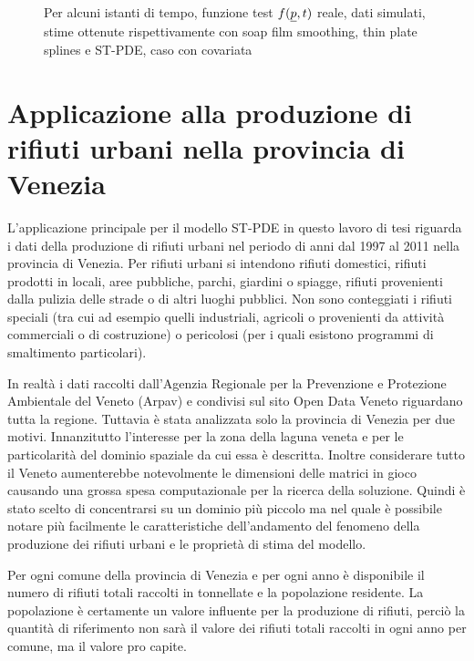 \documentclass[a4paper,11pt,twoside,openright]{book}							%
\begin{document}
\begin{landscape}
\begin{figure}
\begin{tabular}{lccccccc}
\end{tabular}
\caption{Per alcuni istanti di tempo, funzione test $f(\protect\underline{p},t)$ reale, dati simulati, stime ottenute rispettivamente con soap film smoothing, thin plate splines e ST-PDE, caso con covariata}
\label{fig:confronto_altri_metodi_cov}
\end{figure}
\end{landscape}


\chapter{Applicazione alla produzione di rifiuti urbani nella provincia di Venezia}
\label{cap:rifiuti}

L'applicazione principale per il modello ST-PDE in questo lavoro di tesi riguarda i dati della produzione di rifiuti urbani nel periodo di anni dal 1997 al 2011 nella provincia di Venezia. Per rifiuti urbani si intendono rifiuti domestici, rifiuti prodotti in locali, aree pubbliche, parchi, giardini o spiagge, rifiuti provenienti dalla pulizia delle strade o di altri luoghi pubblici. Non sono conteggiati i rifiuti speciali (tra cui ad esempio quelli industriali, agricoli o provenienti da attività commerciali o di costruzione) o pericolosi (per i quali esistono programmi di smaltimento particolari).

In realtà i dati raccolti dall'Agenzia Regionale per la Prevenzione e Protezione Ambientale del Veneto (Arpav) e condivisi sul sito Open Data Veneto riguardano tutta la regione. Tuttavia è stata analizzata solo la provincia di Venezia per due motivi. Innanzitutto l'interesse per la zona della laguna veneta e per le particolarità del dominio spaziale da cui essa è descritta. Inoltre considerare tutto il Veneto aumenterebbe notevolmente le dimensioni delle matrici in gioco causando una grossa spesa computazionale per la ricerca della soluzione. Quindi è stato scelto di concentrarsi su un dominio più piccolo ma nel quale è possibile notare più facilmente le caratteristiche dell'andamento del fenomeno della produzione dei rifiuti urbani e le proprietà di stima del modello.

Per ogni comune della provincia di Venezia e per ogni anno è disponibile il numero di rifiuti totali raccolti in tonnellate e la popolazione residente. La popolazione è certamente un valore influente per la produzione di rifiuti, perciò la quantità di riferimento non sarà il valore dei rifiuti totali raccolti in ogni anno per comune, ma il valore pro capite.
\end{document}
